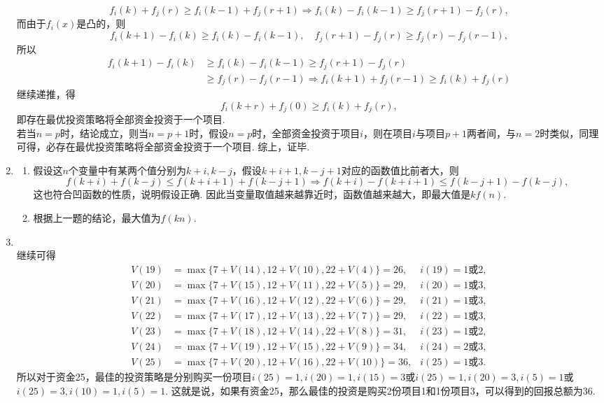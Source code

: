 \begin{enumerate}[label=\arabic{section}.\arabic*]
    \[f_i(k)+f_j(r) \geq f_i(k-1)+f_j(r+1) \Rightarrow f_i(k)-f_i(k-1) \geq f_j(r+1)-f_j(r),\]
    而由于$f_i(x)$是凸的，则
    \[f_i(k+1)-f_i(k) \geq f_i(k)-f_i(k-1), \quad f_j(r+1)-f_j(r) \geq f_j(r)-f_j(r-1),\]
    所以\begin{align*}
        f_i(k+1)-f_i(k) & \geq f_i(k)-f_i(k-1) \geq f_j(r+1)-f_j(r)\\
        & \geq f_j(r)-f_j(r-1) \Rightarrow f_i(k+1)+f_j(r-1) \geq f_i(k)+f_j(r)
    \end{align*}
    继续递推，得\[f_i(k+r)+f_j(0) \geq f_i(k)+f_j(r),\]
    即存在最优投资策略将全部资金投资于一个项目.\\
    若当$n=p$时，结论成立，则当$n=p+1$时，假设$n=p$时，全部资金投资于项目$i$，则在项目$i$与项目$p+1$两者间，与$n=2$时类似，同理可得，必存在最优投资策略将全部资金投资于一个项目. 综上，证毕.
    \item \pro
    \begin{enumerate}[label=\alph*)]
        \item 假设这$n$个变量中有某两个值分别为$k+i,k-j$，假设$k+i+1,k-j+1$对应的函数值比前者大，则
        \[f(k+i)+f(k-j) \leq f(k+i+1)+f(k-j+1) \Rightarrow f(k+i)-f(k+i+1) \leq f(k-j+1)-f(k-j),\]
        这也符合凹函数的性质，说明假设正确. 因此当变量取值越来越靠近时，函数值越来越大，即最大值是$kf(n)$.
        \item 根据上一题的结论，最大值为$f(kn)$.
    \end{enumerate}
    \item \sol \\
    继续可得
    \begin{align*}
        V(19)&=\max\{7+V(14),12+V(10),22+V(4)\}=26, & i(19)=1\text{或}2,\\
        V(20)&=\max\{7+V(15),12+V(11),22+V(5)\}=29, & i(20)=1\text{或}3,\\
        V(21)&=\max\{7+V(16),12+V(12),22+V(6)\}=29, & i(21)=1\text{或}3,\\
        V(22)&=\max\{7+V(17),12+V(13),22+V(7)\}=29, & i(22)=1\text{或}3,\\
        V(23)&=\max\{7+V(18),12+V(14),22+V(8)\}=31, & i(23)=1\text{或}2,\\
        V(24)&=\max\{7+V(19),12+V(15),22+V(9)\}=34, & i(24)=2\text{或}3,\\
        V(25)&=\max\{7+V(20),12+V(16),22+V(10)\}=36, & i(25)=1\text{或}3.
    \end{align*}
    所以对于资金25，最佳的投资策略是分别购买一份项目$i(25)=1,i(20)=1,i(15)=3$或$i(25)=1,i(20)=3,i(5)=1$或$i(25)=3,i(10)=1,i(5)=1$. 这就是说，如果有资金25，那么最佳的投资是购买2份项目1和1份项目3，可以得到的回报总额为36.

\end{enumerate}
